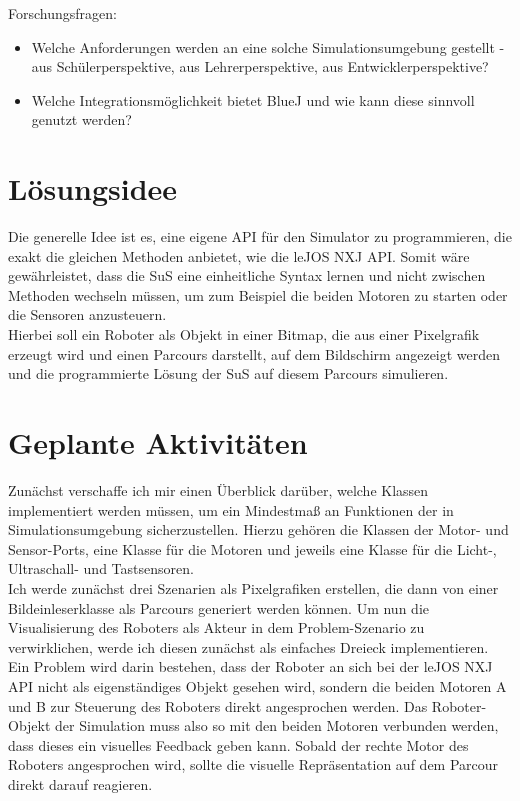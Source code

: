 \documentclass[paper=a4, pagesize, DIV=calc, BCOR=12.5mm, twoside=on, onecolumn=on, open = any, titlepage =on, parskip =half-, headsepline = on, footsepline = on, chapterprefix = on, appendixprefix = off, fontsize = 12pt, numbers = noenddot, abstract = on]{scrbook}
\numberwithin{equation}{chapter}
\begin{document}
Forschungsfragen:\\
\begin{itemize}
\item Welche Anforderungen werden an eine solche Simulationsumgebung gestellt - aus Schülerperspektive, aus Lehrerperspektive, aus Entwicklerperspektive?
\item Welche Integrationsmöglichkeit bietet BlueJ und wie kann diese sinnvoll genutzt werden?
\end{itemize}

\par \singlespacing
\section*{Lösungsidee}
\onehalfspacing
Die generelle Idee ist es, eine eigene API für den Simulator zu programmieren, die exakt die gleichen Methoden anbietet, wie die leJOS NXJ API. Somit wäre gewährleistet, dass die SuS eine einheitliche Syntax lernen und nicht zwischen Methoden wechseln müssen, um zum Beispiel die beiden Motoren zu starten oder die Sensoren anzusteuern.\\
Hierbei soll ein Roboter als Objekt in einer Bitmap, die aus einer Pixelgrafik erzeugt wird und einen Parcours darstellt, auf dem Bildschirm angezeigt werden und die programmierte Lösung der SuS auf diesem Parcours simulieren.\\


\par \singlespacing
\section*{Geplante Aktivitäten}
\onehalfspacing
Zunächst verschaffe ich mir einen Überblick darüber, welche Klassen implementiert werden müssen, um ein Mindestmaß an Funktionen der in Simulationsumgebung sicherzustellen. Hierzu gehören die Klassen der Motor- und Sensor-Ports, eine Klasse für die Motoren und jeweils eine Klasse für die Licht-, Ultraschall- und Tastsensoren.\\
Ich werde zunächst drei Szenarien als Pixelgrafiken erstellen, die dann von einer Bildeinleserklasse als Parcours generiert werden können. Um nun die Visualisierung des Roboters als Akteur in dem Problem-Szenario zu verwirklichen, werde ich diesen zunächst als einfaches Dreieck implementieren.\\
Ein Problem wird darin bestehen, dass der Roboter an sich bei der leJOS NXJ API nicht als eigenständiges Objekt gesehen wird, sondern die beiden Motoren A und B zur Steuerung des Roboters direkt angesprochen werden. Das Roboter-Objekt der Simulation muss also so mit den beiden Motoren verbunden werden, dass dieses ein visuelles Feedback geben kann. Sobald der rechte Motor des Roboters angesprochen wird, sollte die visuelle Repräsentation auf dem Parcour direkt darauf reagieren. 
\end{document}
